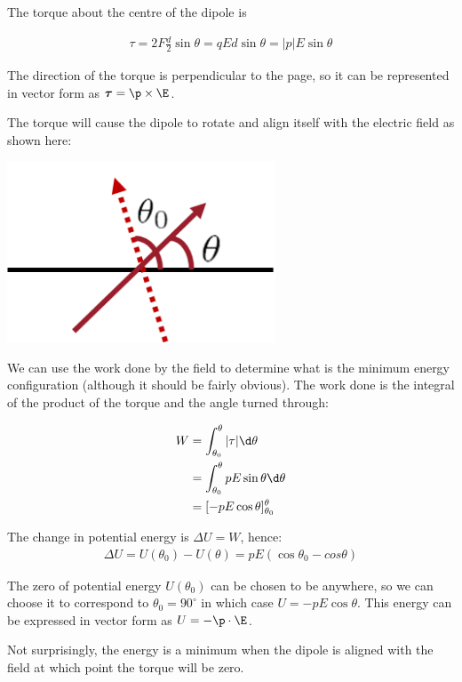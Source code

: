\documentclass[
]{book}
\begin{document}
The torque about the centre of the dipole is

\[\begin{aligned}
\tau = 2 F \frac{d}{2} \sin\theta = q E d \sin\theta = |p|E \sin\theta
\end{aligned}\]

The direction of the torque is perpendicular to the page, so it can be
represented in vector form as \(\boldsymbol{\tau} = \p \times \E\).

The torque will cause the dipole to rotate and align itself with the
electric field as shown here:

\includegraphics[width=80mm,height=\textheight]{Figures/dipole_align.png} \protect\hypertarget{fig:diAlign}{}{}

We can use the work done by the field to determine what is the minimum
energy configuration (although it should be fairly obvious). The work
done is the integral of the product of the torque and the angle turned
through:

\[\begin{aligned}
W &= \int_{\theta_0}^{\theta} |\tau| \d\theta \\
&= \int_{\theta_0}^{\theta} pE \sin\theta \d\theta \\ 
&= [-pE \cos\theta]_{\theta_0}^{\theta}
\end{aligned}\]

The change in potential energy is \(\Delta U = W\), hence:
\[\begin{aligned}
\Delta U = U(\theta_0) - U(\theta) = pE(\cos⁡\theta_0 - cos\theta)
\end{aligned}\]

The zero of potential energy \(U(\theta_0)\) can be chosen to be anywhere,
so we can choose it to correspond to \(\theta_0 = 90^{\circ}\) in which
case \(U = -pE \cos\theta\). This energy can be expressed in vector form
as \(U = - \p \cdot \E\).

Not surprisingly, the energy is a minimum when the dipole is aligned
with the field at which point the torque will be zero.
\end{document}
